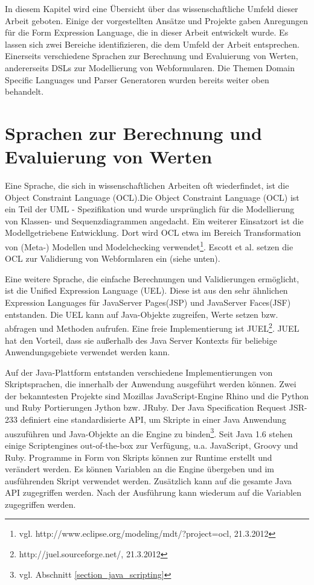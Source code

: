 In diesem Kapitel wird eine Über\-sicht über das wissenschaftliche Umfeld dieser Arbeit geboten. Einige der vorgestellten Ansätze und Projekte gaben Anregungen für die Form Expression Language, die in dieser Arbeit entwickelt wurde. Es lassen sich zwei Bereiche identifizieren, die dem Umfeld der Arbeit entsprechen. Einerseits verschiedene Sprachen zur Berechnung und Eva\-lu\-ier\-ung von Werten, andererseits DSLs zur Modellierung von Webformularen. Die Themen Domain Specific Languages und Parser Generatoren wurden bereits weiter oben behandelt.

\section{Sprachen zur Berechnung und Eva\-lu\-ier\-ung von Werten}

Eine Sprache, die sich in wissenschaftlichen Arbeiten oft wiederfindet, ist die Object Constraint Language (OCL)\cite{RiGo98}.Die Object Constraint Language (OCL) ist ein Teil der UML - Spezifikation und wurde ursprünglich für die Modellierung von Klassen- und Sequenzdiagrammen angedacht. Ein weiterer Einsatzort ist die Modellgetriebene Entwicklung. Dort wird OCL etwa im Bereich Transformation von (Meta-) Modellen und Modelchecking verwendet\footnote{vgl. http://www.eclipse.org/modeling/mdt/?project=ocl, 21.3.2012}. Escott et al.\cite{Esco12} setzen die OCL zur Validierung von Webformlaren ein (siehe unten).

Eine weitere Sprache, die einfache Berechnungen und Validierungen er\-mög\-licht, ist die Unified Expression Language (UEL). Diese ist aus den sehr ähnlichen Expression Languages für JavaServer Pages(JSP) und JavaServer Faces(JSF) entstanden. Die UEL kann auf Java-Objekte zugreifen, Werte setzen bzw. abfragen und Methoden aufrufen. Eine freie Implementierung ist JUEL\footnote{http://juel.sourceforge.net/, 21.3.2012}. JUEL hat den Vorteil, dass sie außerhalb des Java Server Kontexts für beliebige Anwendungsgebiete verwendet werden kann.

Auf der Java-Plattform entstanden verschiedene Implementierungen von Skriptsprachen, die innerhalb der Anwendung ausgeführt werden können. Zwei der bekanntesten Projekte sind Mozillas Java\-Script-Engine Rhino\cite{wwwRhino} und die Python und Ruby Portierungen Jython bzw. JRuby. Der Java Specification Request JSR-233 definiert eine standardisierte API\cite{JSR-223}, um Skripte in einer Java Anwendung auszuführen und Java-Objekte an die Engine zu binden\footnote{vgl. Abschnitt \ref{section_java_scripting}}.  Seit Java 1.6 stehen einige Scriptengines out-of-the-box zur Verfügung, u.a. Java\-Script, Groovy und Ruby. Programme in Form von Skripts können zur Runtime erstellt und verändert werden. Es können Variablen an die Engine übergeben und im ausführenden Skript verwendet werden. Zu\-sätz\-lich kann auf die gesamte Java API zugegriffen werden. Nach der Aus\-führ\-ung kann wiederum auf die Variablen zugegriffen werden. 

